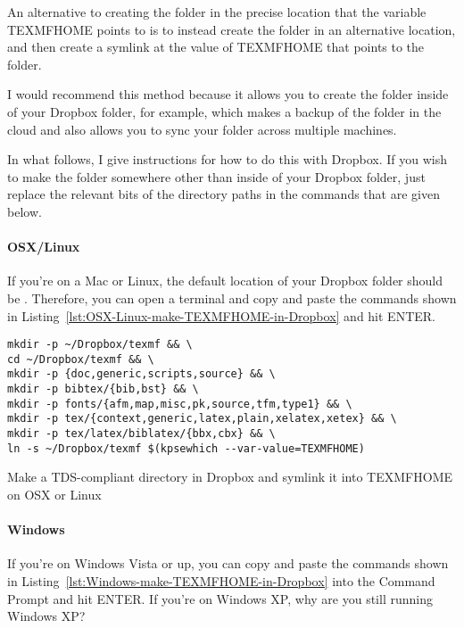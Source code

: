 An alternative to creating the  folder in the precise location that the variable TEXMFHOME points to is to instead create the folder in an alternative location, and then create a symlink at the value of TEXMFHOME that points to the  folder.

I would recommend this method because it allows you to create the  folder inside of your Dropbox folder, for example, which makes a backup of the  folder in the cloud and also allows you to sync your  folder across multiple machines.

In what follows, I give instructions for how to do this with Dropbox.
If you wish to make the folder somewhere other than inside of your Dropbox folder, just replace the relevant bits of the directory paths in the commands that are given below.

\paragraph{OSX/Linux}

If you're on a Mac or Linux, the default location of your Dropbox folder should be .
Therefore, you can open a terminal and copy and paste the commands shown in Listing~\ref{lst:OSX-Linux-make-TEXMFHOME-in-Dropbox} and hit ENTER.

\begin{listing}[htbp]
	\centering
	\begin{verbatim}
mkdir -p ~/Dropbox/texmf && \
cd ~/Dropbox/texmf && \
mkdir -p {doc,generic,scripts,source} && \
mkdir -p bibtex/{bib,bst} && \
mkdir -p fonts/{afm,map,misc,pk,source,tfm,type1} && \
mkdir -p tex/{context,generic,latex,plain,xelatex,xetex} && \
mkdir -p tex/latex/biblatex/{bbx,cbx} && \
ln -s ~/Dropbox/texmf $(kpsewhich --var-value=TEXMFHOME)
	\end{verbatim}
	\caption{Make a TDS-compliant directory in Dropbox and symlink it into TEXMFHOME on OSX or Linux}
	\label{lst:OSX-Linux-make-TEXMFHOME-in-Dropbox}
\end{listing}

\paragraph{Windows}

If you're on Windows Vista or up, you can copy and paste the commands shown in Listing~\ref{lst:Windows-make-TEXMFHOME-in-Dropbox} into the Command Prompt and hit ENTER.
If you're on Windows XP, why are you still running Windows XP?

